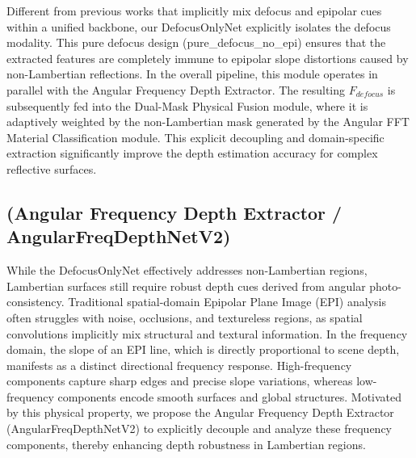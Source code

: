 \documentclass[lettersize,journal]{IEEEtran}
\begin{document}
Different from previous works that implicitly mix defocus and epipolar cues within a unified backbone, our DefocusOnlyNet explicitly isolates the defocus modality. This pure defocus design (pure_defocus_no_epi) ensures that the extracted features are completely immune to epipolar slope distortions caused by non-Lambertian reflections. In the overall pipeline, this module operates in parallel with the Angular Frequency Depth Extractor. The resulting $F_{defocus}$ is subsequently fed into the Dual-Mask Physical Fusion module, where it is adaptively weighted by the non-Lambertian mask generated by the Angular FFT Material Classification module. This explicit decoupling and domain-specific extraction significantly improve the depth estimation accuracy for complex reflective surfaces.

\subsection{(Angular Frequency Depth Extractor / AngularFreqDepthNetV2)}

While the DefocusOnlyNet effectively addresses non-Lambertian regions, Lambertian surfaces still require robust depth cues derived from angular photo-consistency. Traditional spatial-domain Epipolar Plane Image (EPI) analysis often struggles with noise, occlusions, and textureless regions, as spatial convolutions implicitly mix structural and textural information. In the frequency domain, the slope of an EPI line, which is directly proportional to scene depth, manifests as a distinct directional frequency response. High-frequency components capture sharp edges and precise slope variations, whereas low-frequency components encode smooth surfaces and global structures. Motivated by this physical property, we propose the Angular Frequency Depth Extractor (AngularFreqDepthNetV2) to explicitly decouple and analyze these frequency components, thereby enhancing depth robustness in Lambertian regions.
\end{document}
